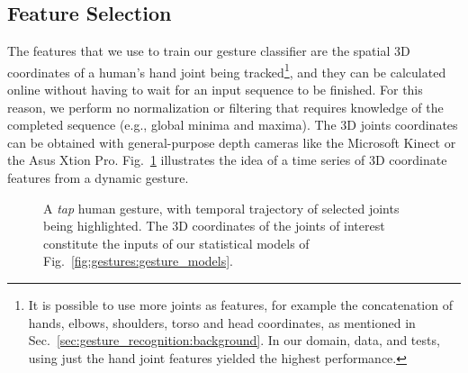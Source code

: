 \subsection{Feature Selection}
\label{sec:gesture_recognition:approach:gesture_model:features}

The features that we use to train our gesture classifier are the spatial 3D coordinates of a human's hand joint being tracked\footnote{%
It is possible to use more joints as features, for example the concatenation of hands, elbows, shoulders, torso and head coordinates, as mentioned in Sec.~\ref{sec:gesture_recognition:background}. In our domain, data, and tests, using just the hand joint features yielded the highest performance.%
}, and they can be calculated online without having to wait for an input sequence to be finished.
For this reason, we perform no normalization or filtering that requires knowledge of the completed sequence (e.g., global minima and maxima).
The 3D joints coordinates can be obtained with general-purpose depth cameras like the Microsoft Kinect or the Asus Xtion Pro.
Fig.~\ref{fig:gestures:human_overlay} illustrates the idea of a time series of 3D coordinate features from a dynamic gesture.

\begin{figure}
\centering
{} \quad
%
 \quad
%
\caption[A \emph{tap} human gesture, with temporal trajectory of selected joints being highlighted.]{A \emph{tap} human gesture, with temporal trajectory of selected joints being highlighted. The 3D coordinates of the joints of interest constitute the inputs of our statistical models of Fig.~\ref{fig:gestures:gesture_models}.}
\label{fig:gestures:human_overlay}
\end{figure}

